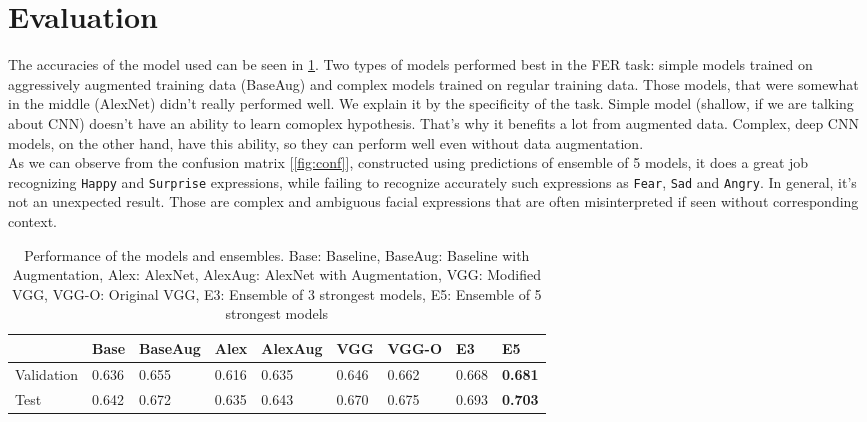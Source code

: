 \section{Evaluation}

The accuracies of the model used can be seen in \ref{table:acc}. Two types of models performed best in the FER task: simple models trained on aggressively augmented training data (BaseAug) and complex models trained on regular training data. Those models, that were somewhat in the middle (AlexNet) didn't really performed well. We explain it by the specificity of the task. Simple model (shallow, if we are talking about CNN) doesn't have an ability to learn comoplex hypothesis. That's why it benefits a lot from augmented data. Complex, deep CNN models, on the other hand, have this ability, so they can perform well even without data augmentation.\\

As we can observe from the confusion matrix [\ref{fig:conf}], constructed using predictions of ensemble of 5 models, it does a great job recognizing \texttt{Happy} and \texttt{Surprise} expressions, while failing to recognize accurately such expressions as \texttt{Fear}, \texttt{Sad} and \texttt{Angry}. In general, it's not an unexpected result. Those are complex and ambiguous facial expressions that are often misinterpreted if seen without corresponding context. 

\begin{table}[H]
	\centering
	\begin{tabular}{ | l | l | l | l | l | l | l | l | l | }
		\hline
		 & Base & BaseAug & Alex & AlexAug & VGG & VGG-O & E3 & E5 \\ 
		\hline
		Validation & 0.636 & 0.655 & 0.616 & 0.635 & 0.646 & 0.662 & 0.668 & \textbf{0.681} \\
		Test & 0.642 & 0.672 & 0.635 & 0.643 & 0.670 & 0.675 & 0.693 & \textbf{0.703} \\ 
		\hline
	\end{tabular}
	\caption{Performance of the models and ensembles. Base: Baseline, BaseAug: Baseline with Augmentation, Alex: AlexNet, AlexAug: AlexNet with Augmentation, VGG: Modified VGG, VGG-O: Original VGG, E3: Ensemble of 3 strongest models, E5: Ensemble of 5 strongest models}
	\label{table:acc}
\end{table}

